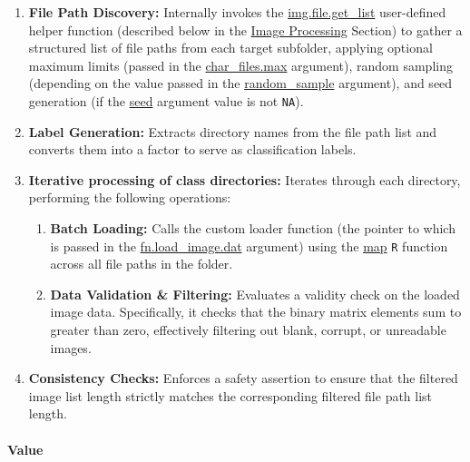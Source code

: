 \documentclass[
]{report}
\providecommand{\tightlist}{%
  \setlength{\itemsep}{0pt}\setlength{\parskip}{0pt}}
\begin{document}
\begin{enumerate}
\def\labelenumi{\arabic{enumi}.}
\item
  \textbf{File Path Discovery:} Internally invokes the \hyperref[func.img.file.get_list]{img.file.get\_list} user-defined helper function (described below in the \hyperref[appndx_aux40img_proc]{Image Processing} Section) to gather a structured list of file paths from each target subfolder, applying optional maximum limits (passed in the \hyperref[func.load_image.list.args.char_files.max]{char\_files.max} argument), random sampling (depending on the value passed in the \hyperref[func.load_image.list.args.random_sample]{random\_sample} argument), and seed generation (if the \hyperref[func.load_image.list.args.seed]{seed} argument value is not \texttt{NA}).
\item
  \textbf{Label Generation:} Extracts directory names from the file path list and converts them into a factor to serve as classification labels.
\item
  \textbf{Iterative processing of class directories:} Iterates through each directory, performing the following operations:

  \begin{enumerate}
  \def\labelenumii{\alph{enumii})}
  \tightlist
  \item
    \textbf{Batch Loading:} Calls the custom loader function (the pointer to which is passed in the \hyperref[func.load_image.list.args.fn.load_image.dat]{fn.load\_image.dat} argument) using the \href{https://www.rdocumentation.org/packages/purrr/versions/1.2.0/topics/map}{map} \texttt{R} function across all file paths in the folder.
  \item
    \textbf{Data Validation \& Filtering:} Evaluates a validity check on the loaded image data. Specifically, it checks that the binary matrix elements sum to greater than zero, effectively filtering out blank, corrupt, or unreadable images.
  \end{enumerate}
\item
  \textbf{Consistency Checks:} Enforces a safety assertion to ensure that the filtered image list length strictly matches the corresponding filtered file path list length.
\end{enumerate}

\protect{}\label{func.load_image.list.value}
\paragraph{Value}\label{value}
\end{document}
